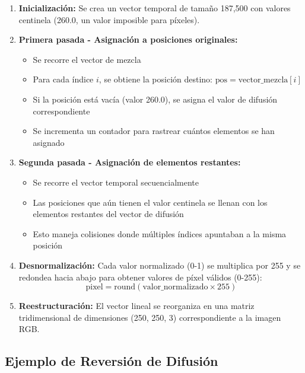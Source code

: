 \documentclass[12pt,a4paper]{article}
\begin{document}
	\begin{enumerate}
		\item \textbf{Inicialización:} Se crea un vector temporal de tamaño 187,500 con valores centinela (260.0, un valor imposible para píxeles).
		
		\item \textbf{Primera pasada - Asignación a posiciones originales:}
		\begin{itemize}
			\item Se recorre el vector de mezcla
			\item Para cada índice $i$, se obtiene la posición destino: $\text{pos} = \text{vector\_mezcla}[i]$
			\item Si la posición está vacía (valor 260.0), se asigna el valor de difusión correspondiente
			\item Se incrementa un contador para rastrear cuántos elementos se han asignado
		\end{itemize}
		
		\item \textbf{Segunda pasada - Asignación de elementos restantes:}
		\begin{itemize}
			\item Se recorre el vector temporal secuencialmente
			\item Las posiciones que aún tienen el valor centinela se llenan con los elementos restantes del vector de difusión
			\item Esto maneja colisiones donde múltiples índices apuntaban a la misma posición
		\end{itemize}
		
		\item \textbf{Desnormalización:} Cada valor normalizado (0-1) se multiplica por 255 y se redondea hacia abajo para obtener valores de píxel válidos (0-255):
		$$\text{pixel} = \text{round}(\text{valor\_normalizado} \times 255)$$
		
		\item \textbf{Reestructuración:} El vector lineal se reorganiza en una matriz tridimensional de dimensiones (250, 250, 3) correspondiente a la imagen RGB.
	\end{enumerate}
	
	\subsection{Ejemplo de Reversión de Difusión}
	
\end{document}
